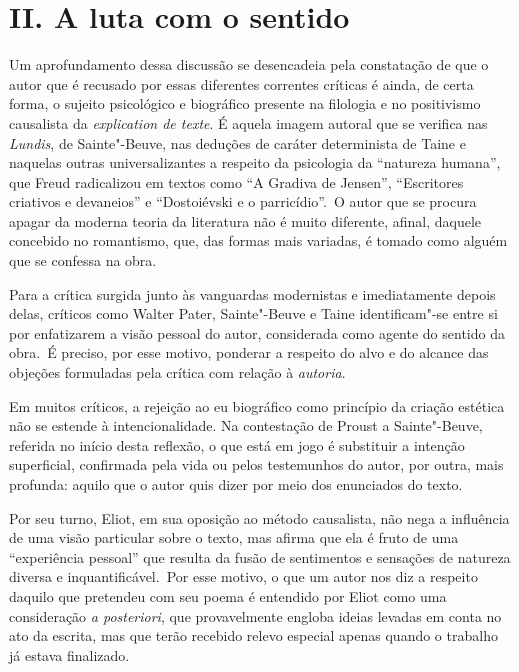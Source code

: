 \pagebreak

\section*{II. A luta com o sentido}

Um aprofundamento dessa discussão se desencadeia pela constatação de que
o autor que é recusado por essas diferentes correntes críticas é ainda,
de certa forma, o sujeito psicológico e biográfico presente na filologia
e no positivismo causalista da \emph{explication de texte}. É aquela
imagem autoral que se verifica nas \emph{Lundis}, de Sainte"-Beuve, nas
deduções de caráter determinista de Taine e naquelas outras
universalizantes a respeito da psicologia da ``natureza humana'', que
Freud radicalizou em textos como ``A Gradiva de Jensen'', ``Escritores
criativos e devaneios'' e ``Dostoiévski e o parricídio''.~O autor que se
procura apagar da moderna teoria da literatura não é muito diferente,
afinal, daquele concebido no romantismo, que, das formas mais variadas,
é tomado como alguém que se confessa na obra.

Para a crítica surgida junto às vanguardas modernistas e imediatamente
depois delas, críticos como Walter Pater, Sainte"-Beuve e Taine identificam"-se entre si por enfatizarem a visão pessoal do autor,
considerada como agente do sentido da obra.~É preciso, por esse motivo,
ponderar a respeito do alvo e do alcance das objeções formuladas pela
crítica com relação à \emph{autoria}.

Em muitos críticos, a rejeição ao eu biográfico como princípio da
criação estética não se estende à intencionalidade. Na contestação de
Proust a Sainte"-Beuve, referida no início desta reflexão, o que está em
jogo é substituir a intenção superficial, confirmada pela vida ou pelos
testemunhos do autor, por outra, mais profunda: aquilo que o autor quis
dizer por meio dos enunciados do texto.

Por seu turno, Eliot, em sua oposição ao método causalista, não nega a
influência de uma visão particular sobre o texto, mas afirma que ela é
fruto de uma ``experiência pessoal'' que resulta da fusão de sentimentos
e sensações de natureza diversa e inquantificável.~Por esse motivo, o
que um autor nos diz a respeito daquilo que pretendeu com seu poema é
entendido por Eliot como uma consideração \emph{a posteriori}, que
provavelmente engloba ideias levadas em conta no ato da escrita, mas que
terão recebido relevo especial apenas quando o trabalho já estava
finalizado.


